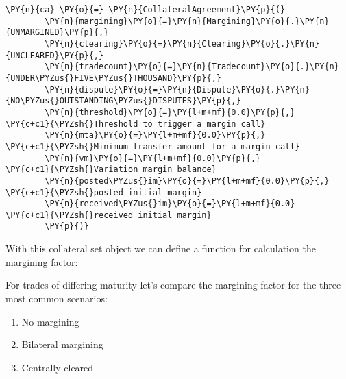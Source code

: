     \begin{tcolorbox}[breakable, size=fbox, boxrule=1pt, pad at break*=1mm,colback=cellbackground, colframe=cellborder]
\begin{Verbatim}[commandchars=\\\{\}]
\PY{n}{ca} \PY{o}{=} \PY{n}{CollateralAgreement}\PY{p}{(}
        \PY{n}{margining}\PY{o}{=}\PY{n}{Margining}\PY{o}{.}\PY{n}{UNMARGINED}\PY{p}{,}
        \PY{n}{clearing}\PY{o}{=}\PY{n}{Clearing}\PY{o}{.}\PY{n}{UNCLEARED}\PY{p}{,}
        \PY{n}{tradecount}\PY{o}{=}\PY{n}{Tradecount}\PY{o}{.}\PY{n}{UNDER\PYZus{}FIVE\PYZus{}THOUSAND}\PY{p}{,}
        \PY{n}{dispute}\PY{o}{=}\PY{n}{Dispute}\PY{o}{.}\PY{n}{NO\PYZus{}OUTSTANDING\PYZus{}DISPUTES}\PY{p}{,}
        \PY{n}{threshold}\PY{o}{=}\PY{l+m+mf}{0.0}\PY{p}{,}      \PY{c+c1}{\PYZsh{}Threshold to trigger a margin call}
        \PY{n}{mta}\PY{o}{=}\PY{l+m+mf}{0.0}\PY{p}{,}            \PY{c+c1}{\PYZsh{}Minimum transfer amount for a margin call}
        \PY{n}{vm}\PY{o}{=}\PY{l+m+mf}{0.0}\PY{p}{,}             \PY{c+c1}{\PYZsh{}Variation margin balance}
        \PY{n}{posted\PYZus{}im}\PY{o}{=}\PY{l+m+mf}{0.0}\PY{p}{,}      \PY{c+c1}{\PYZsh{}posted initial margin}
        \PY{n}{received\PYZus{}im}\PY{o}{=}\PY{l+m+mf}{0.0}     \PY{c+c1}{\PYZsh{}received initial margin}
        \PY{p}{)}
\end{Verbatim}
\end{tcolorbox}

    With this collateral set object we can define a function for calculation
the margining factor:

    For trades of differing maturity let's compare the margining factor for
the three most common scenarios:

\begin{enumerate}
\def\labelenumi{\arabic{enumi}.}
\tightlist
\item
  No margining
\item
  Bilateral margining
\item
  Centrally cleared
\end{enumerate}
 
            \begin{tcolorbox}[breakable, size=fbox, boxrule=.5pt, pad at break*=1mm, opacityfill=0]
    
                \end{tcolorbox}

    


